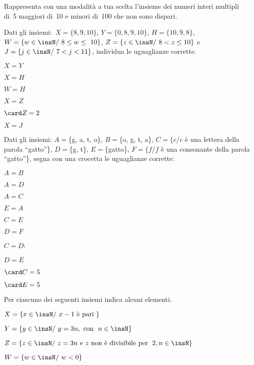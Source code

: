 \begin{esercizio}
\label{ese:6.26}
Rappresenta con una modalità a tua scelta l'insieme dei numeri interi multipli 
di~5 maggiori di~10 e minori di~100 che non
sono dispari.
\end{esercizio}

\begin{esercizio}
\label{ese:6.27}
Dati gli insiemi:~$X=\{8, 9, 10\}$, $Y=\{0, 8, 9, 10\}$, $H=\{10, 9, 8\}$,
$W=\{w\in\insN/\ 8\le w\le~10\}$, $Z=\{z\in\insN/\ 8<z\le10\}$ 
e~$J=\{j\in\insN/\ 7<j<11\}$,
individua le uguaglianze corrette.
\begin{multicols}{3}
\begin{enumeratea}
\item $X = Y$
\item $X= H$
\item $W = H$
\item $X = Z$
\item $\card Z=2$
\item $X = J$
\end{enumeratea}
\end{multicols}
\end{esercizio}

\begin{esercizio}
\label{ese:6.28}
Dati gli insiemi:
$A=$\{g, a, t, o\}, $B=$\{o, g, t, a\}, $C=\{c/c$ è una lettera della parola 
``gatto''\},
$D=$\{g, t\}, $E=$\{gatto\}, $F=\{f / f$ è una consonante della parola 
``gatto''\},
segna con una crocetta le uguaglianze corrette:
\begin{multicols}{4}
\begin{enumeratea}
 \item $A = B$
 \item $A = D$
 \item $A = C$
 \item $E = A$
 \item $C = E$
 \item $D = F$
 \item $C = D$:
 \item $D = E$
 \columnbreak
 \item $\card C=5$
 \item $\card E=5$
\end{enumeratea}
\end{multicols}
\end{esercizio}

\begin{esercizio}
\label{ese:6.29}
Per ciascuno dei seguenti insiemi indica alcuni elementi.
\TabPositions{6cm}
\begin{enumeratea}
\item $X=\{x\in\insN/\ x-1\text{ è pari }\}$\dotfill
\item $Y=\{y\in\insN/\ y=3n,\text{ con }\ n\in\insN\}$\dotfill
\item $Z=\{z\in\insN/\ z=3n\text{ e } z\text{ non è divisibile per 
}\;2,n\in\insN\}$\dotfill
\item $W=\{w\in\insN/\ w<0\}$\dotfill
\end{enumeratea}
\end{esercizio}

